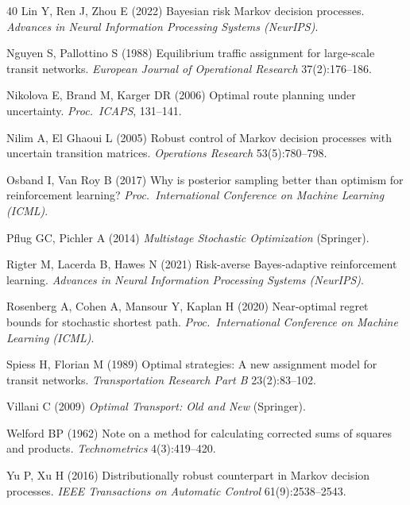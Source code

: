 \documentclass[opre,dblanonrev]{informs4}
\begin{document}
\begin{thebibliography}{40}
Lin Y, Ren J, Zhou E (2022) Bayesian risk Markov decision processes.
\emph{Advances in Neural Information Processing Systems (NeurIPS)}.

Nguyen S, Pallottino S (1988) Equilibrium traffic assignment for large-scale
transit networks. \emph{European Journal of Operational Research}
37(2):176--186.

Nikolova E, Brand M, Karger DR (2006) Optimal route planning under
uncertainty. \emph{Proc.\ ICAPS}, 131--141.

Nilim A, El Ghaoui L (2005) Robust control of Markov decision processes
with uncertain transition matrices. \emph{Operations Research} 53(5):780--798.

Osband I, Van Roy B (2017) Why is posterior sampling better than optimism
for reinforcement learning? \emph{Proc.\ International Conference on
Machine Learning (ICML)}.

Pflug GC, Pichler A (2014) \emph{Multistage Stochastic Optimization}
(Springer).

Rigter M, Lacerda B, Hawes N (2021) Risk-averse Bayes-adaptive reinforcement
learning. \emph{Advances in Neural Information Processing Systems (NeurIPS)}.

Rosenberg A, Cohen A, Mansour Y, Kaplan H (2020) Near-optimal regret bounds for
stochastic shortest path. \emph{Proc.\ International Conference on Machine
Learning (ICML)}.

Spiess H, Florian M (1989) Optimal strategies: A new assignment model for
transit networks. \emph{Transportation Research Part B} 23(2):83--102.

Villani C (2009) \emph{Optimal Transport: Old and New} (Springer).

Welford BP (1962) Note on a method for calculating corrected sums of squares
and products. \emph{Technometrics} 4(3):419--420.

Yu P, Xu H (2016) Distributionally robust counterpart in Markov decision
processes. \emph{IEEE Transactions on Automatic Control} 61(9):2538--2543.

\end{thebibliography}
\end{document}
